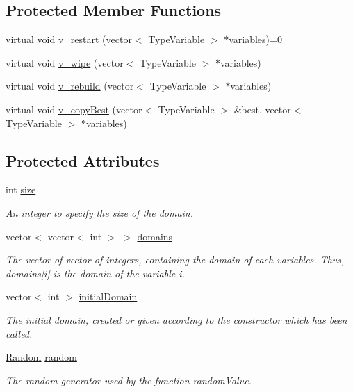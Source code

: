 \subsection*{Protected Member Functions}
\begin{DoxyCompactItemize}
\item 
virtual void \hyperlink{classghost_1_1Domain_aee3a6ae1de917ffb936c978633ac2663}{v\-\_\-restart} (vector$<$ Type\-Variable $>$ $\ast$variables)=0
\item 
virtual void \hyperlink{classghost_1_1Domain_ad0adb4cc8b6c9d2b9aec3f20e7fde1ef}{v\-\_\-wipe} (vector$<$ Type\-Variable $>$ $\ast$variables)
\item 
virtual void \hyperlink{classghost_1_1Domain_aef5aef1cb394b5093e9a68c653c54ce5}{v\-\_\-rebuild} (vector$<$ Type\-Variable $>$ $\ast$variables)
\item 
virtual void \hyperlink{classghost_1_1Domain_a7762faaf0884425e46ac6609bc347c63}{v\-\_\-copy\-Best} (vector$<$ Type\-Variable $>$ \&best, vector$<$ Type\-Variable $>$ $\ast$variables)
\end{DoxyCompactItemize}
\subsection*{Protected Attributes}
\begin{DoxyCompactItemize}
\item 
int \hyperlink{classghost_1_1Domain_a13e282f60c6c7cddf5b5716b45ad161c}{size}
\begin{DoxyCompactList}\small\item\em An integer to specify the size of the domain. \end{DoxyCompactList}\item 
vector$<$ vector$<$ int $>$ $>$ \hyperlink{classghost_1_1Domain_a6940f37aa773c6c94cff18cfe1e6a7f7}{domains}
\begin{DoxyCompactList}\small\item\em The vector of vector of integers, containing the domain of each variables. Thus, domains\mbox{[}i\mbox{]} is the domain of the variable i. \end{DoxyCompactList}\item 
vector$<$ int $>$ \hyperlink{classghost_1_1Domain_a8890ca1323c293a4a1e2aa1830eff043}{initial\-Domain}
\begin{DoxyCompactList}\small\item\em The initial domain, created or given according to the constructor which has been called. \end{DoxyCompactList}\item 
\hyperlink{classghost_1_1Random}{Random} \hyperlink{classghost_1_1Domain_ab6a7a58f8a147f5b2b475e106627fad2}{random}
\begin{DoxyCompactList}\small\item\em The random generator used by the function random\-Value. \end{DoxyCompactList}\end{DoxyCompactItemize}
